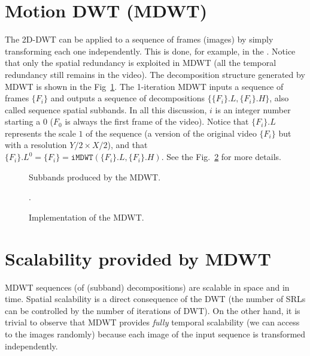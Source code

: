 

\section{Motion DWT (MDWT)}

The 2D-DWT can be applied to a sequence of frames (images) by simply
transforming each one independently. This is done, for example, in the
. Notice
that only the spatial redundancy is exploited in MDWT (all the
temporal redundancy still remains in the video). The decomposition
structure generated by MDWT is shown in the
Fig~\ref{fig:MDWT-subbands}. The 1-iteration MDWT inputs a sequence of
frames $\{F_i\}$ and outputs a sequence of decompositions
$\{\{F_i\}.L, \{F_i\}.H\}$, also called sequence spatial subbands. In
all this discussion, $i$ is an integer number starting a $0$ ($F_0$ is
always the first frame of the video). Notice that $\{F_i\}.L$
represents the scale $1$ of the sequence (a version of the original
video $\{F_i\}$ but with a resolution $Y/2\times X/2$), and that
$\{F_i\}.L^0 = \{F_i\} = \mathtt{iMDWT}(\{F_i\}.L,\{F_i\}.H )$. See
the Fig.~\ref{fig:MDWT-implementation} for more details.

\begin{figure}
  \centering {}
  \caption{Subbands produced by the MDWT.} %
  \label{fig:MDWT-subbands}
\end{figure}

\begin{figure}
  .
  \caption{Implementation of the MDWT.} %
  \label{fig:MDWT-implementation}
\end{figure}


\section{Scalability provided by MDWT}

MDWT sequences (of (subband) decompositions) are scalable in space and
in time. Spatial scalability is a direct consequence of the DWT
(the number of SRLs can be controlled by the number of iterations of
DWT). On the other hand, it is trivial to observe that MDWT
provides \emph{fully} temporal scalability (we can access to the
images randomly) because each image of the input sequence is
transformed independently.

